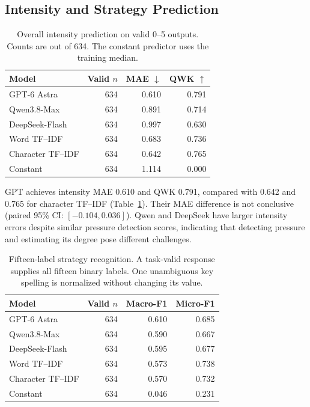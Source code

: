 \documentclass[11pt]{article}
\begin{document}
\subsection{Intensity and Strategy Prediction}
\begin{table}[t]
\centering\small
\setlength{\tabcolsep}{3pt}
\begin{tabular}{@{}lrrr@{}}
\toprule
Model & Valid $n$ & MAE $\downarrow$ & QWK $\uparrow$\\
\midrule
GPT-6 Astra & 634 & 0.610 & 0.791\\
Qwen3.8-Max & 634 & 0.891 & 0.714\\
DeepSeek-Flash & 634 & 0.997 & 0.630\\
Word TF--IDF & 634 & 0.683 & 0.736\\
Character TF--IDF & 634 & 0.642 & 0.765\\
Constant & 634 & 1.114 & 0.000\\
\bottomrule
\end{tabular}
\caption{Overall intensity prediction on valid 0--5 outputs. Counts are out of 634. The constant predictor uses the training median.}
\label{tab:intensity_results}
\end{table}
GPT achieves intensity MAE 0.610 and QWK 0.791, compared with 0.642 and
0.765 for character TF--IDF (Table~\ref{tab:intensity_results}). Their MAE
difference is not conclusive (paired 95\% CI: $[-0.104, 0.036]$).
Qwen and DeepSeek have larger intensity errors despite similar pressure
detection scores, indicating that detecting pressure and estimating its
degree pose different challenges.

\begin{table}[t]
\centering\small
\setlength{\tabcolsep}{3pt}
\begin{tabular}{@{}lrrr@{}}
\toprule
Model & Valid $n$ & Macro-F1 & Micro-F1\\
\midrule
GPT-6 Astra & 634 & 0.610 & 0.685\\
Qwen3.8-Max & 634 & 0.590 & 0.667\\
DeepSeek-Flash & 634 & 0.595 & 0.677\\
Word TF--IDF & 634 & 0.573 & 0.738\\
Character TF--IDF & 634 & 0.570 & 0.732\\
Constant & 634 & 0.046 & 0.231\\
\bottomrule
\end{tabular}
\caption{Fifteen-label strategy recognition. A task-valid response supplies all fifteen binary labels. One unambiguous key spelling is normalized without changing its value.}
\label{tab:strategy_results}
\end{table}
\end{document}
